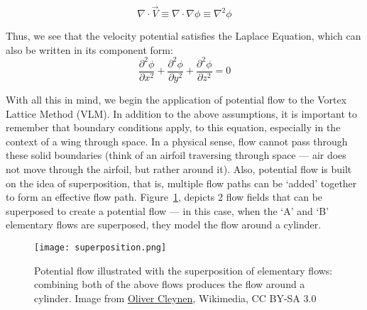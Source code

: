 \documentclass{article}
\begin{document}
\begin{itemize}
\begin{equation}\label{eq:solution_proof}
\nabla \cdot \vec{V} \equiv \nabla \cdot \nabla \phi \equiv \nabla^2\phi
\end{equation}

Thus, we see that the velocity potential satisfies the Laplace Equation, which can also be written in its component form:
\begin{equation}\label{eq:component_laplace}
\frac{\partial^2 \phi}{\partial x^2} + \frac{\partial^2 \phi}{\partial y^2} + \frac{\partial^2 \phi}{\partial z^2} = 0
\end{equation}

With all this in mind, we begin the application of potential flow to the Vortex Lattice Method (VLM). In addition to the above assumptions, it is important to remember that boundary conditions apply,
to this equation, especially in the context of a wing through space. In a physical sense, flow cannot pass through these solid boundaries (think of an airfoil traversing through space --- air does not move through the airfoil, but rather around it). Also, potential flow is built on the idea of superposition, that is, multiple flow paths can be `added' together to form an effective flow path.
Figure~\ref{fig:superposition}, depicts 2 flow fields that can be superposed to create a potential flow --- in this case, when the `A' and `B' elementary flows are superposed, they model the flow around a cylinder.
        
\begin{figure}[H]
    \hspace*{\dimexpr\labelsep+\labelwidth}
        \begin{minipage}{0.915\linewidth}
            \centering
            \texttt{[image: superposition.png]}
            \captionsetup{width=\linewidth}
            \caption{Potential flow illustrated with the superposition of elementary flows: combining both of the above flows produces the flow around a cylinder.  Image from 
            \href{https://commons.wikimedia.org/wiki/File:Construction_of_a_potential_flow.svg}{Oliver Cleynen}, Wikimedia, CC BY-SA 3.0}\label{fig:superposition}
        \end{minipage}
\end{figure}


\end{itemize}
\end{document}
